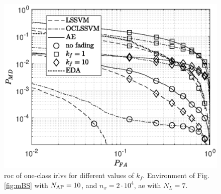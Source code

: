 \documentclass[draftcls,journal,onecolumn]{IEEEtran}
\begin{document}
\begin{figure}[t]
    \centering
    \includegraphics[width=\columnwidth]{res_Fading_new_10BS_oneClass.eps}
    \caption{\ac{roc} of one-class \acp{irlv} for different values of $k_f$. Environment of Fig. \ref{fig:mBS} with $N_{\rm AP}=10$, and $n_x= 2 \cdot 10^4$,  \ac{ae} with $N_L = 7$.  }
    \label{fig:kf10Oc}
\end{figure}





\end{document}

